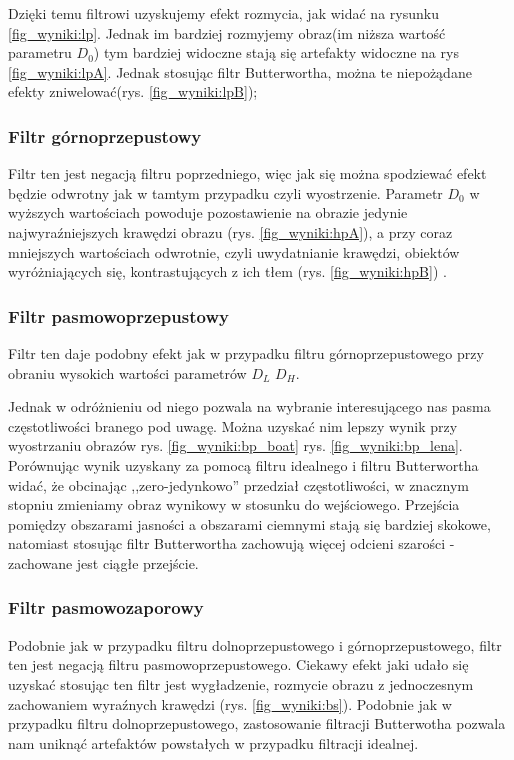\documentclass{classrep}
\begin{document}
Dzięki temu filtrowi uzyskujemy efekt rozmycia, jak widać na rysunku \ref{fig_wyniki:lp}. Jednak im bardziej rozmyjemy obraz(im niższa wartość parametru $D_0$) tym bardziej widoczne stają się artefakty widoczne na rys \ref{fig_wyniki:lpA}. Jednak stosując filtr Butterwortha, można te niepożądane efekty zniwelować(rys. \ref{fig_wyniki:lpB});

\subsubsection{Filtr górnoprzepustowy}

Filtr ten jest negacją filtru poprzedniego, więc jak się można spodziewać efekt będzie odwrotny jak w tamtym przypadku czyli wyostrzenie. Parametr $D_0$ w wyższych wartościach powoduje pozostawienie na obrazie jedynie najwyraźniejszych krawędzi obrazu (rys. \ref{fig_wyniki:hpA}), a przy coraz mniejszych wartościach odwrotnie, czyli uwydatnianie krawędzi, obiektów wyróżniających się, kontrastujących z ich tłem (rys. \ref{fig_wyniki:hpB}) .

\subsubsection{Filtr pasmowoprzepustowy}

Filtr ten daje podobny efekt jak w przypadku filtru górnoprzepustowego przy obraniu wysokich wartości parametrów  $D_L$ $D_H$.

Jednak w odróżnieniu od niego pozwala na wybranie interesującego nas pasma częstotliwości branego pod uwagę. Można uzyskać nim lepszy wynik przy wyostrzaniu obrazów  rys. \ref{fig_wyniki:bp_boat}  rys. \ref{fig_wyniki:bp_lena}. Porównując wynik uzyskany za pomocą filtru idealnego i filtru Butterwortha widać, że obcinając ,,zero-jedynkowo'' przedział częstotliwości, w znacznym stopniu zmieniamy obraz wynikowy w stosunku do wejściowego. Przejścia pomiędzy obszarami jasności a obszarami ciemnymi stają się bardziej skokowe, natomiast stosując filtr Butterwortha zachowują więcej odcieni szarości - zachowane jest ciągłe przejście.


\subsubsection{Filtr pasmowozaporowy}

Podobnie jak w przypadku filtru dolnoprzepustowego i górnoprzepustowego, filtr ten jest negacją filtru pasmowoprzepustowego. Ciekawy efekt jaki udało się uzyskać stosując ten filtr jest wygładzenie, rozmycie obrazu z jednoczesnym zachowaniem wyraźnych krawędzi (rys. \ref{fig_wyniki:bs}). Podobnie jak w przypadku filtru dolnoprzepustowego, zastosowanie filtracji Butterwotha pozwala nam uniknąć artefaktów powstałych w przypadku filtracji idealnej.
\end{document}
